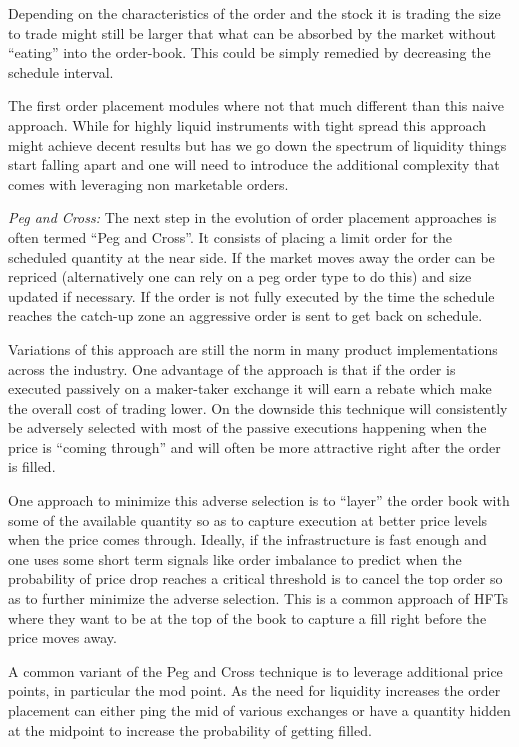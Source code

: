Depending  on the characteristics of the order and the stock it is trading the size to trade might still be larger that what can be absorbed by the market without ``eating'' into the order-book. This could be simply remedied by decreasing the schedule interval.


The first order placement modules where not that much different than this naive approach. While for highly liquid instruments with tight spread this approach might achieve decent results but has we go down the spectrum of liquidity things start falling apart and one will need to introduce the additional complexity that comes with leveraging non marketable orders. \twomedskip


\noindent\emph{Peg and Cross:} The next step in the evolution of order placement approaches is often termed ``Peg and Cross''. It consists of placing a limit order  for the scheduled quantity at the near side. If the market moves away the order can be repriced (alternatively one can rely on a peg order type to do this) and size updated if necessary. If the order is not fully executed by the time the schedule reaches the catch-up zone an aggressive order is sent to get back on schedule.


Variations of this approach are still the norm in many product implementations across the industry. One advantage of the approach is that if  the order is executed passively on a maker-taker exchange it will earn a rebate which make the overall cost of trading lower. On the downside this technique will consistently be adversely selected with most of the passive executions happening when the price is ``coming through'' and will often be more attractive right after the order is filled.


One approach to minimize this adverse selection is to ``layer'' the order book with some of the available quantity so as to capture execution at better price levels when the price comes through. Ideally, if the infrastructure is fast enough and one uses some short term signals like order imbalance to predict when the probability of price drop reaches a critical threshold is to cancel the top order so as to further minimize the adverse selection. This is a common approach of HFTs where they want to be at the top of the book to capture a fill right before the price moves away.


A common variant of the Peg and Cross technique is to leverage additional price points, in particular the mod point. As the need for liquidity increases the order placement can either ping the mid of various exchanges or have a quantity hidden at the midpoint to increase the probability of getting filled. \twomedskip


